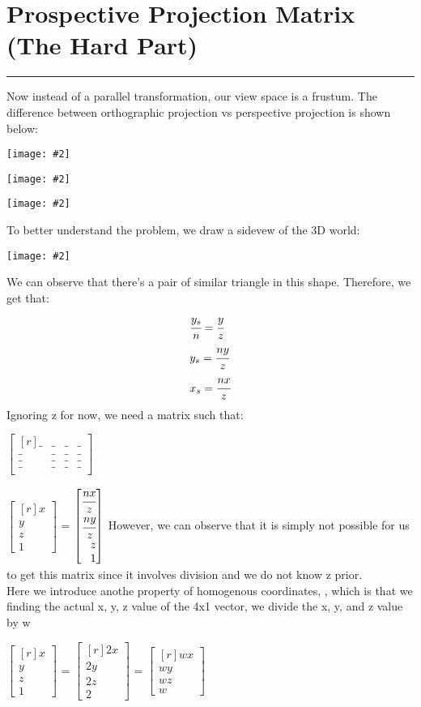 \documentclass[11pt]{article}
\newcommand{\image}[2]{\texttt{[image: \#2]}}
\newcommand{\mysection}[1]{
    \section*{#1}
    \hrule
    \vspace*{0.5cm}
}
\newcommand{\mat}[1]{
    $\begin{bmatrix*}[r]
        #1
    \end{bmatrix*}$
} %
\newcommand{\myalign}[1]{\begin{align*}#1\end{align*}}
\newcommand{\gap}{\vspace*{0.5cm}}
\begin{document}
\mysection{Prospective Projection Matrix (The Hard Part)}
Now instead of a parallel transformation, our view space is a frustum. The difference between orthographic projection vs perspective projection is shown below:
\begin{center}
    \image{0.4}{o_v_p}
\end{center}
\begin{center}
    \image{0.4}{perspective_projection_1}
\end{center}
\begin{center}
    \image{0.4}{perspective_projection_2}
\end{center}
To better understand the problem, we draw a sidevew of the 3D world:
\begin{center}
    \image{0.8}{perspective_projection_3}
\end{center}
We can observe that there's a pair of similar triangle in this shape. Therefore, we get that:
\myalign{
    & \cfrac{y_s}{n} = \cfrac{y}{z} \\
    & y_s = \cfrac{ny}{z} \\
    & x_s = \cfrac{nx}{z} \\
}
Ignoring z for now, we need a matrix such that: 
\mat{
    \_ & \_ & \_ & \_ \\
    \_ & \_ & \_ & \_ \\
    \_ & \_ & \_ & \_ \\
    \_ & \_ & \_ & \_ \\
} \mat{
    x \\ y \\ z \\ 1
} = \mat{
    \cfrac{nx}{z} \\ \cfrac{ny}{z} \\ z \\ 1
} \gap
However, we can observe that it is simply not possible for us to get this matrix since it involves division and we do not know z prior. \\
Here we introduce anothe property of homogenous coordinates, , which is that we finding the actual x, y, z value of the 4x1 vector, we divide the x, y, and z value by w \\
\begin{center}
    \mat{
    x \\ y \\ z \\ 1
} = \mat{
    2x \\ 2y \\ 2z \\ 2
} = \mat{
    wx \\ wy \\ wz \\ w
}
\end{center}
\end{document}
